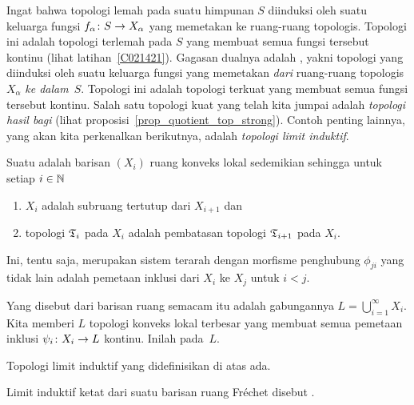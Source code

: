 Ingat bahwa topologi lemah pada suatu himpunan $S$ diinduksi oleh suatu keluarga fungsi $f_\alpha \colon S \rightarrow
X_\alpha$ yang memetakan ke ruang-ruang topologis. Topologi ini adalah topologi terlemah pada $S$ yang membuat
semua fungsi tersebut kontinu (lihat latihan~\ref{C021421}). Gagasan dualnya adalah
, yakni topologi yang diinduksi oleh suatu keluarga fungsi yang memetakan \emph{dari}
ruang-ruang topologis $X_\alpha$ \emph{ke dalam}~$S$. Topologi ini adalah topologi terkuat yang membuat
semua fungsi tersebut kontinu. Salah satu topologi kuat yang telah kita jumpai adalah
\emph{topologi hasil bagi} (lihat proposisi~\ref{prop_quotient_top_strong}). Contoh penting lainnya,
yang akan kita perkenalkan berikutnya, adalah \emph{topologi limit induktif}.


\begin{defn} Suatu
 adalah barisan $(X_i)$ ruang konveks lokal sedemikian sehingga untuk setiap $i \in \mathbb{N}$
   \begin{enumerate}
     \item[(i)] $X_i$ adalah subruang tertutup dari $X_{i+1}$ dan
     \item[(ii)] topologi $\mathfrak{T}_i$ pada $X_i$ adalah pembatasan topologi $\mathfrak{T}_{i+1}$ pada $X_i$.
   \end{enumerate}
Ini, tentu saja, merupakan sistem terarah dengan morfisme penghubung $\phi_{ji}$ yang tidak lain adalah pemetaan inklusi dari $X_i$ ke $X_j$ untuk $i < j$.

Yang disebut
 dari barisan ruang semacam itu adalah gabungannya $L = \bigcup_{i=1}^\infty X_i$. Kita memberi $L$ topologi
konveks lokal terbesar yang membuat semua pemetaan inklusi $\psi_i\colon X_i \rightarrow L$ kontinu. Inilah
 pada~$L$.
\end{defn}

\begin{prop} Topologi limit induktif yang didefinisikan di atas ada.
\end{prop}

\begin{defn} Limit induktif ketat dari suatu barisan ruang Fr\'echet disebut
.
\end{defn}

